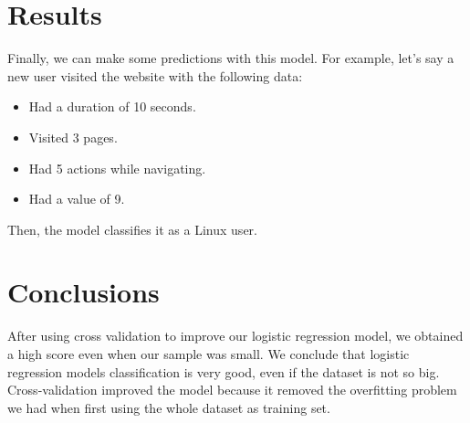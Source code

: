 \documentclass[10pt]{article}
\begin{document}
\section{Results}
Finally, we can make some predictions with this model. For example, let's say a new user visited the website with the following data: \par
\begin{itemize}
  \item Had a duration of 10 seconds.
  \item Visited 3 pages.
  \item Had 5 actions while navigating.
  \item Had a value of 9.
\end{itemize}
Then, the model classifies it as a Linux user.

\section{Conclusions}
After using cross validation to improve our logistic regression model, we obtained a high score even when our sample was small. We conclude that logistic regression models classification is very good, even if the dataset is not so big. Cross-validation improved the model because it removed the overfitting problem we had when first using the whole dataset as training set.



\end{document}
